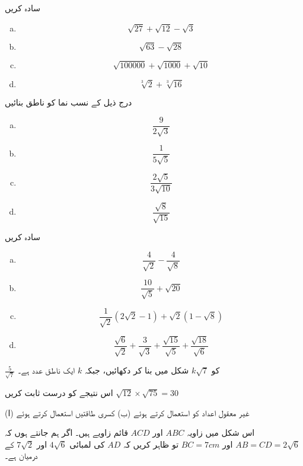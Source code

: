 
سادہ کریں
\begin{multicols}{4}
\begin{enumerate}[a.]
\item
\[\sqrt{27}+\sqrt{12}-\sqrt{3}\]
\item
\[\sqrt{63}-\sqrt{28}\]
\item
\[\sqrt{\num{100000}}+\sqrt{1000}+\sqrt{10}\]
\item
\[\sqrt[3]{2}+\sqrt[3]{16}\]
\end{enumerate}
\end{multicols}
درج ذیل کے نسب نما کو ناطق بنائیں
\begin{multicols}{4}
\begin{enumerate}[a.]
\item
\[\frac{9}{2\sqrt{3}}\]
\item
\[\frac{1}{5\sqrt{5}}\]
\item
\[\frac{2\sqrt{5}}{3\sqrt{10}}\]
\item
\[\frac{\sqrt{8}}{\sqrt{15}}\]
\end{enumerate}
\end{multicols}

سادہ کریں
\begin{multicols}{2}
\begin{enumerate}[a.]
\item
\[\frac{4}{\sqrt{2}}-\frac{4}{\sqrt{8}}\]
\item
\[\frac{10}{\sqrt{5}}+\sqrt{20}\]
\item
\[\frac{1}{\sqrt{2}}(2\sqrt{2}-1)+\sqrt{2}(1-\sqrt{8})\]
\item
\[\frac{\sqrt{6}}{\sqrt{2}}+\frac{3}{\sqrt{3}}+\frac{\sqrt{15}}{\sqrt{5}}+\frac{\sqrt{18}}{\sqrt{6}}\]
\end{enumerate}
\end{multicols}
\(\frac{5}{\sqrt{7}}\) کو \(k\sqrt{7}\) شکل میں بنا کر دکھائیں، جبکہ \(k\) ایک ناطق عدد ہے۔

اس نتیجے کو درست ثابت کریں \(\sqrt{12}\times\sqrt{75}=30\)

(ا) غیر معقول اعداد کو استعمال کرتے ہوئے
(ب) کسری طاقتیں استعمال کرتے ہوئے

اس شکل میں زاویہ \(ABC\) اور \(ACD\) قائم زاویے ہیں۔
اگر ہم جانتے ہوں کہ \(AB=CD=2\sqrt{6}\) اور \(BC=7cm\) تو ظاہر کریں کہ \(AD\) کی لمبائی \(4\sqrt{6}\) اور \(7\sqrt{2}\) کے درمیان ہے۔

